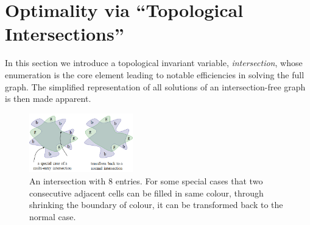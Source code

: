 \documentclass[conference]{IEEEtran}
\begin{document}
\section{Optimality via ``Topological Intersections''}
\label{section_intersection}
In this section we introduce a topological invariant variable, \textit{intersection}, whose enumeration is the core element leading to notable efficiencies in solving the full graph. The simplified representation of all solutions of an intersection-free graph is then made apparent.  


\begin{figure}[t]
\centering
\includegraphics[width = 0.4\textwidth]{figures/multi_entry}
\caption{An intersection with $8$ entries. For some special cases that two consecutive adjacent cells can be filled in same colour, through shrinking the boundary of colour, it can be transformed back to the normal case. }\label{fig:multi_entry}
\end{figure}
\end{document}
